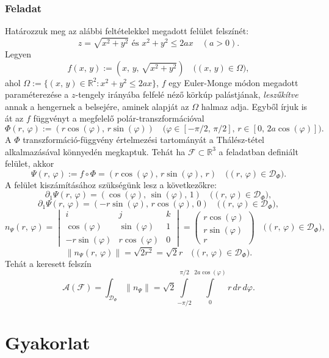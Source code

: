 \documentclass{article}
\newcommand{\R}{\mathbb{R}}
\begin{document}
	\subsubsection{Feladat}
	Határozzuk meg az alábbi feltételekkel megadott felület felszínét:
	\[
		z = \sqrt{x^2 + y^2} \text{ és } x^2 + y^2 \leq 2ax \quad (a > 0).
	\]
	Legyen
	\[
		f(x, \, y) := (x, \, y, \, \sqrt{x^2 + y^2}) \quad \big( (x, \, y) \in \Omega \big),
	\]
	ahol $\Omega := \{ (x, \, y) \in \R^2 : x^2 + y^2 \leq 2 ax \}$, $f$ egy Euler-Monge módon megadott paraméterezése a $z$-tengely irányába felfelé néző körkúp palástjának, \textit{leszűkítve} annak a hengernek a belsejére, aminek alapját az $\Omega$ halmaz adja. Egyből írjuk is át az $f$ függvényt a megfelelő polár-transzformációval
	\[
		\Phi(r, \, \varphi) := (r \cos(\varphi), \, r \sin(\varphi)) \quad \big( \varphi \in [- \pi / 2, \, \pi / 2], \, r \in [0, \, 2a \cos(\varphi)]\big).
	\]
	A $\Phi$ transzformáció-függvény értelmezési tartományát a Thálész-tétel alkalmazásával könnyedén megkaptuk. Tehát ha $\mathcal{F} \subset \R^3$ a feladatban definiált felület, akkor
	\[
		\Psi(r, \, \varphi) := f \circ \Phi = (r \cos(\varphi), \, r \sin(\varphi), \, r) \quad \big( (r, \, \varphi) \in \mathcal{D}_\Phi \big).
	\]
	A felület kiszámításához szükségünk lesz a következőkre:
	\[
		\partial_1 \Psi(r, \, \varphi) = (\cos(\varphi), \, \sin(\varphi), \, 1) \quad \big( (r, \, \varphi) \in \mathcal{D}_\Phi \big),
	\]
	\[
		\partial_1 \Psi(r, \, \varphi) = (-r \sin(\varphi), \, r \cos(\varphi), \, 0) \quad \big( (r, \, \varphi) \in \mathcal{D}_\Phi \big),
	\]
	\[
		n_\Psi(r, \, \varphi) = \begin{vmatrix}
			i & j & k \\
			\cos(\varphi) & \sin(\varphi) & 1 \\
			-r\sin(\varphi) & r\cos(\varphi) & 0
		\end{vmatrix} =
		\begin{pmatrix}
			r\cos(\varphi) \\
			r\sin(\varphi) \\
			r
		\end{pmatrix} \quad \big( (r, \, \varphi) \in \mathcal{D}_\Phi \big),
	\]
	\[
		\|n_\Psi(r, \, \varphi)\| = \sqrt{2r^2} = \sqrt{2} r \quad \big( (r, \, \varphi) \in \mathcal{D}_\Phi \big).
	\]
	Tehát a keresett felszín
	\[
		\mathcal{A}(\mathcal{F}) = \int_{\mathcal{D}_\Phi} \|n_\Psi\| = \sqrt{2} \int\limits_{-\pi/2}^{\pi/2} \int\limits_0^{2a\cos(\varphi)} r \, dr \, d\varphi.
	\]

	\newpage
	\section{Gyakorlat}
\end{document}
